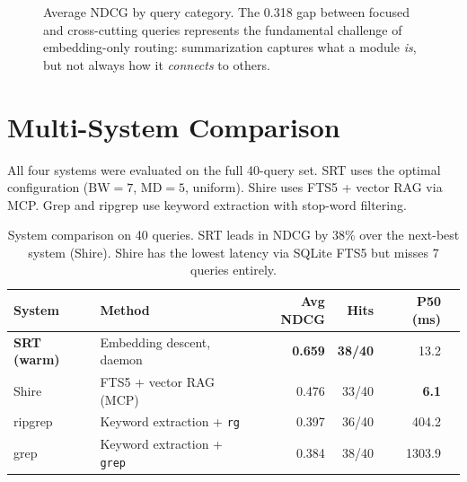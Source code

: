 \documentclass[11pt,a4paper]{article}
\begin{document}
\begin{figure}[h]
\centering
{}
\caption{Average NDCG by query category. The 0.318 gap between focused and cross-cutting queries represents the fundamental challenge of embedding-only routing: summarization captures what a module \emph{is}, but not always how it \emph{connects} to others.}
\end{figure}

\section{Multi-System Comparison}

All four systems were evaluated on the full 40-query set. SRT uses the optimal configuration ($\mathrm{BW}=7$, $\mathrm{MD}=5$, uniform). Shire uses FTS5 + vector RAG via MCP. Grep and ripgrep use keyword extraction with stop-word filtering.

\begin{table}[h]
\centering
\footnotesize
\begin{tabular}{llrrrr}
\toprule
\textbf{System} & \textbf{Method} & \textbf{Avg NDCG} & \textbf{Hits} & \textbf{P50 (ms)} \\
\midrule
\textcolor{srt}{\textbf{SRT (warm)}} & Embedding descent, daemon & \textbf{0.659} & \textbf{38/40} & 13.2 \\
\textcolor{shire}{Shire} & FTS5 + vector RAG (MCP) & 0.476 & 33/40 & \textbf{6.1} \\
\textcolor{rg}{ripgrep} & Keyword extraction + \texttt{rg} & 0.397 & 36/40 & 404.2 \\
\textcolor{grepcolor}{grep} & Keyword extraction + \texttt{grep} & 0.384 & 38/40 & 1303.9 \\
\bottomrule
\end{tabular}
\caption{System comparison on 40 queries. SRT leads in NDCG by 38\% over the next-best system (Shire). Shire has the lowest latency via SQLite FTS5 but misses 7 queries entirely.}
\end{table}
\end{document}
